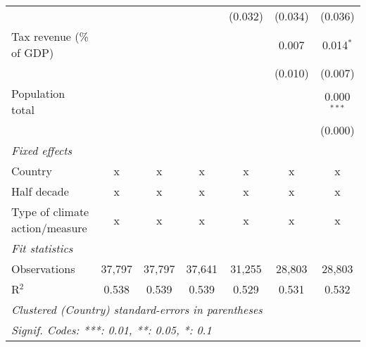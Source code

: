 \begin{tabular}{lcccccc}
                                                             &         &               &               & (0.032)       & (0.034)       & (0.036)\\   
   Tax revenue (\% of GDP)                                   &         &               &               &               & 0.007         & 0.014$^{*}$\\   
                                                             &         &               &               &               & (0.010)       & (0.007)\\   
   Population total                                          &         &               &               &               &               & 0.000$^{***}$\\   
                                                             &         &               &               &               &               & (0.000)\\   
   \emph{Fixed effects}\\
   Country                                                   & x       & x             & x             & x             & x             & x\\  
   Half decade                                               & x       & x             & x             & x             & x             & x\\  
   Type of climate action/measure                            & x       & x             & x             & x             & x             & x\\  
   \midrule \emph{Fit statistics}\\
   Observations                                              & 37,797  & 37,797        & 37,641        & 31,255        & 28,803        & 28,803\\  
   R$^2$                                                     & 0.538   & 0.539         & 0.539         & 0.529         & 0.531         & 0.532\\  
   \midrule
   \multicolumn{7}{l}{\emph{Clustered (Country) standard-errors in parentheses}}\\
   \multicolumn{7}{l}{\emph{Signif. Codes: ***: 0.01, **: 0.05, *: 0.1}}\\
\end{tabular}
\par\endgroup


